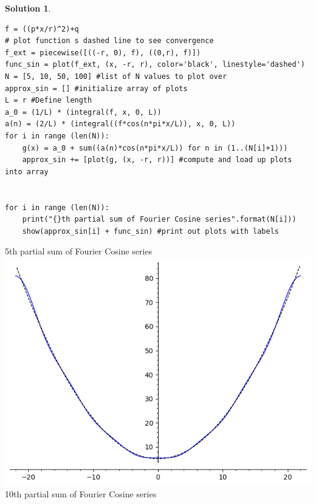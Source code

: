 \documentclass[10pt]{article}
\makeatletter
\theoremstyle{definition}
\newtheorem{soln}{Solution}
\newcommand{\boxspacing}{\kern\kvtcb@left@rule\kern\kvtcb@boxsep}
\newcommand{\prompt}[4]{
    \ttfamily\llap{{\color{#2}[#3]:\hspace{3pt}#4}}\vspace{-\baselineskip}
}
\makeatother
\begin{document}
\begin{soln}
\begin{enumerate}[label=(\alph*)]
\begin{tcolorbox}[breakable, size=fbox, boxrule=1pt, pad at break*=1mm,colback=cellbackground, colframe=cellborder]
\begin{verbatim}
f = ((p*x/r)^2)+q
# plot function s dashed line to see convergence
f_ext = piecewise([((-r, 0), f), ((0,r), f)])
func_sin = plot(f_ext, (x, -r, r), color='black', linestyle='dashed')
N = [5, 10, 50, 100] #list of N values to plot over
approx_sin = [] #initialize array of plots
L = r #Define length
a_0 = (1/L) * (integral(f, x, 0, L))
a(n) = (2/L) * (integral((f*cos(n*pi*x/L)), x, 0, L))
for i in range (len(N)):
    g(x) = a_0 + sum((a(n)*cos(n*pi*x/L)) for n in (1..(N[i]+1)))
    approx_sin += [plot(g, (x, -r, r))] #compute and load up plots into array


for i in range (len(N)):
    print("{}th partial sum of Fourier Cosine series".format(N[i]))
    show(approx_sin[i] + func_sin) #print out plots with labels
              \end{verbatim}
          \end{tcolorbox}
          \begin{tcolorbox}[breakable, size=fbox, boxrule=.5pt, pad at break*=1mm, opacityfill=0]
            \prompt{Out}{outcolor}{1}{\boxspacing}
            5th partial sum of Fourier Cosine series\\
            \includegraphics[scale=0.75]{graphs/g1c.png}\\
            10th partial sum of Fourier Cosine series\\

\end{tcolorbox}
\end{enumerate}
\end{soln}
\end{document}
